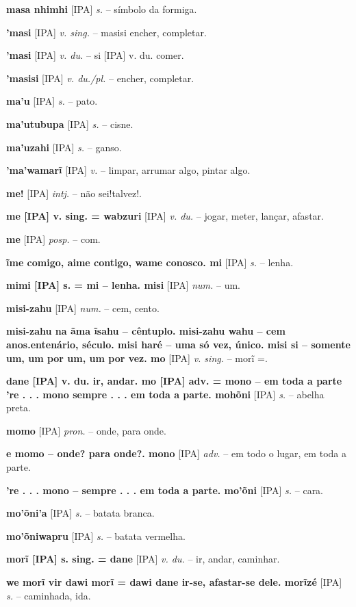 \textbf{masa nhimhi} [IPA] \textit{s.} -- símbolo da formiga.

\textbf{'masi} [IPA] \textit{v. sing.} -- masisi encher, completar.

\textbf{'masi} [IPA] \textit{v. du.} -- si [IPA] v. du. comer.

\textbf{'masisi} [IPA] \textit{v. du./pl.} -- encher, completar.

\textbf{ma'u} [IPA] \textit{s.} -- pato.

\textbf{ma'utubupa} [IPA] \textit{s.} -- cisne.

\textbf{ma'uzahi} [IPA] \textit{s.} -- ganso.

\textbf{'ma'wamarĩ} [IPA] \textit{v.} -- limpar, arrumar algo, pintar algo.

\textbf{me!} [IPA] \textit{intj.} -- não sei!talvez!.

\textbf{me [IPA] v. sing. = wabzuri} [IPA] \textit{v. du.} -- jogar, meter, lançar, afastar.

\textbf{me} [IPA] \textit{posp.} -- com.

\textbf{ĩme comigo, aime contigo, wame conosco. mi} [IPA] \textit{s.} -- lenha.

\textbf{mimi [IPA] s. = mi -- lenha. misi} [IPA] \textit{num.} -- um.

\textbf{misi-zahu} [IPA] \textit{num.} -- cem, cento.

\textbf{misi-zahu na ãma ĩsahu -- cêntuplo. misi-zahu wahu -- cem anos.entenário, século. misi haré -- uma só vez, único. misi si -- somente um, um por um, um por vez. mo} [IPA] \textit{v. sing.} -- morĩ =.

\textbf{dane [IPA] v. du. ir, andar. mo [IPA] adv. = mono -- em toda a parte  're . . . mono sempre . . . em toda a parte. mohõni} [IPA] \textit{s.} -- abelha preta.

\textbf{momo} [IPA] \textit{pron.} -- onde, para onde.

\textbf{e momo -- onde? para onde?. mono} [IPA] \textit{adv.} -- em todo o lugar, em toda a parte.

\textbf{'re . . . mono -- sempre . . . em toda a parte. mo'õni} [IPA] \textit{s.} -- cara.

\textbf{mo'õni'a} [IPA] \textit{s.} -- batata branca.

\textbf{mo'õniwapru} [IPA] \textit{s.} -- batata vermelha.

\textbf{morĩ [IPA] s. sing. = dane} [IPA] \textit{v. du.} -- ir, andar, caminhar.

\textbf{we morĩ vir  dawi morĩ = dawi dane ir-se, afastar-se dele. morĩzé} [IPA] \textit{s.} -- caminhada, ida.

